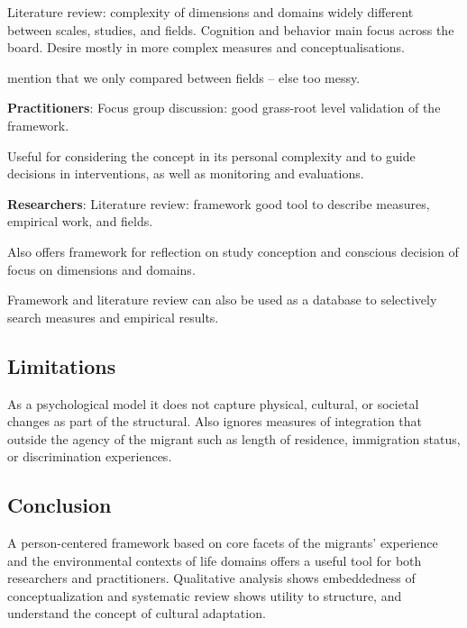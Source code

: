 \documentclass[man, 12pt, a4paper]{apa7}
\begin{document}
Literature review: complexity of dimensions and domains widely different between scales, studies, and fields. Cognition and behavior main focus across the board. Desire mostly in more complex measures and conceptualisations.

mention that we only compared between fields -- else too messy.

\vspace{1em}
\textbf{Practitioners}: Focus group discussion: good grass-root level validation of the framework.

Useful for considering the concept in its personal complexity and to guide decisions in interventions, as well as monitoring and evaluations. 

\textbf{Researchers}: Literature review: framework good tool to describe measures, empirical work, and fields.

Also offers framework for reflection on study conception and conscious decision of focus on dimensions and domains.

Framework and literature review can also be used as a database to selectively search measures and empirical results.
\subsection{Limitations}
As a psychological model it does not capture physical, cultural, or societal changes as part of the structural. Also ignores measures of integration that outside the agency of the migrant such as length of residence, immigration status, or discrimination experiences.

\subsection{Conclusion}
A person-centered framework based on core facets of the migrants’ experience and the environmental contexts of life domains offers a useful tool for both researchers and practitioners. Qualitative analysis shows embeddedness of conceptualization and systematic review shows utility to structure, and understand the concept of cultural adaptation.
\end{document}
